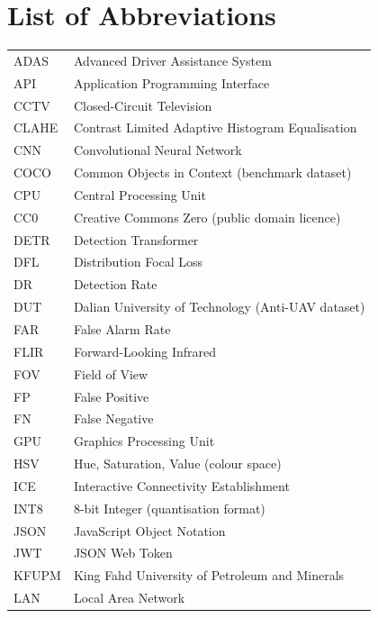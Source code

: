 \documentclass[12pt,a4paper]{report}
\begin{document}
\setcounter{page}{1}
\tableofcontents
\listoffigures
\listoftables

\newpage
\section*{List of Abbreviations}

\begin{longtable}{@{}p{3.2cm}@{}p{11cm}@{}}
ADAS      & Advanced Driver Assistance System \\
API       & Application Programming Interface \\
CCTV      & Closed-Circuit Television \\
CLAHE     & Contrast Limited Adaptive Histogram Equalisation \\
CNN       & Convolutional Neural Network \\
COCO      & Common Objects in Context (benchmark dataset) \\
CPU       & Central Processing Unit \\
CC0       & Creative Commons Zero (public domain licence) \\
DETR      & Detection Transformer \\
DFL       & Distribution Focal Loss \\
DR        & Detection Rate \\
DUT       & Dalian University of Technology (Anti-UAV dataset) \\
FAR       & False Alarm Rate \\
FLIR      & Forward-Looking Infrared \\
FOV       & Field of View \\
FP        & False Positive \\
FN        & False Negative \\
GPU       & Graphics Processing Unit \\
HSV       & Hue, Saturation, Value (colour space) \\
ICE       & Interactive Connectivity Establishment \\
INT8      & 8-bit Integer (quantisation format) \\
JSON      & JavaScript Object Notation \\
JWT       & JSON Web Token \\
KFUPM     & King Fahd University of Petroleum and Minerals \\
LAN       & Local Area Network \\

\end{longtable}
\end{document}
